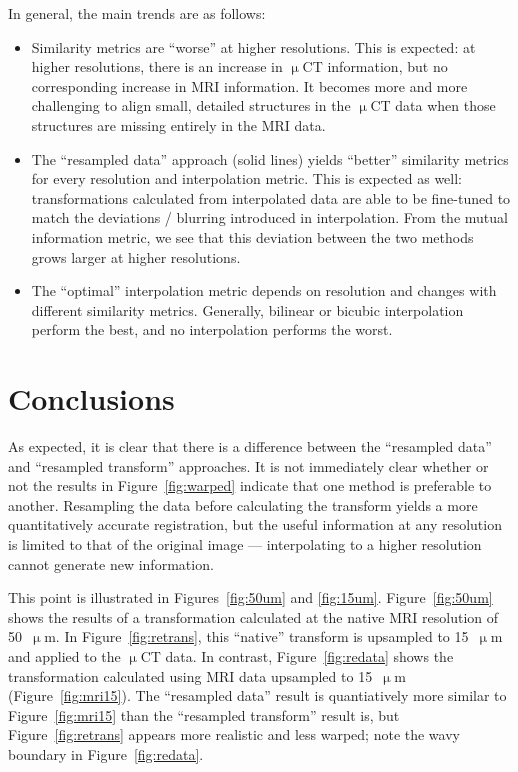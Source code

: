 \documentclass[11pt]{article}
\begin{document}
In general, the main trends are as follows:
\begin{itemize}
\item Similarity metrics are ``worse'' at higher resolutions. This is expected:
  at higher resolutions, there is an increase in $\upmu$CT information, but no
  corresponding increase in MRI information. It becomes more and more
  challenging to align small, detailed structures in the $\upmu$CT data when those
  structures are missing entirely in the MRI data.
\item The ``resampled data'' approach (solid lines) yields ``better'' similarity
  metrics for every resolution and interpolation metric. This is expected as
  well: transformations calculated from interpolated data are able to be fine-tuned
  to match the deviations / blurring introduced in interpolation. From the mutual
  information metric, we see that this deviation between the two methods grows larger
  at higher resolutions. 
\item The ``optimal'' interpolation metric depends on resolution and changes
  with different similarity metrics. Generally, bilinear or bicubic
  interpolation perform the best, and no interpolation performs the worst. 
\end{itemize}


\section{Conclusions}
As expected, it is clear that there is a difference between the ``resampled
data'' and ``resampled transform'' approaches. It is not immediately clear
whether or not the results in Figure~\ref{fig:warped} indicate that one method
is preferable to another. Resampling the data before calculating the transform
yields a more quantitatively accurate registration, but the useful information
at any resolution is limited to that of the original image --- interpolating to
a higher resolution cannot generate new information.

This point is illustrated in Figures~\ref{fig:50um} and \ref{fig:15um}.
Figure~\ref{fig:50um} shows the results of a transformation calculated at the
native MRI resolution of 50~$\upmu$m. In Figure~\ref{fig:retrans}, this
``native'' transform is upsampled to 15~$\upmu$m and applied to the $\upmu$CT
data. In contrast, Figure~\ref{fig:redata} shows the transformation calculated
using MRI data upsampled to 15~$\upmu$m (Figure~\ref{fig:mri15}). The
``resampled data'' result is quantiatively more similar to
Figure~\ref{fig:mri15} than the ``resampled transform'' result is, but
Figure~\ref{fig:retrans} appears more realistic and less warped; note the wavy
boundary in Figure~\ref{fig:redata}.
\end{document}
